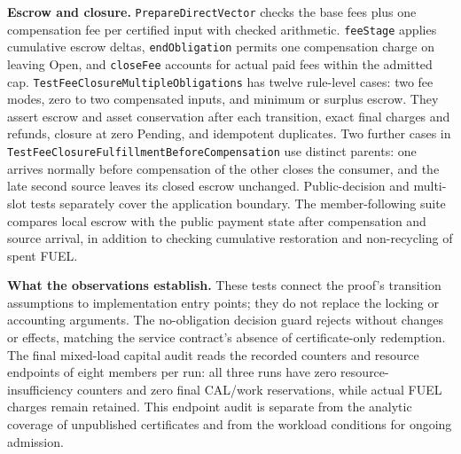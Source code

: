\noindent\textbf{Escrow and closure.}
\texttt{PrepareDirectVector} checks the base fees plus one compensation fee per
certified input with checked arithmetic. \texttt{feeStage} applies cumulative
escrow deltas, \texttt{endObligation} permits one compensation charge on leaving
Open, and \texttt{closeFee} accounts for actual paid fees within the admitted
cap. \texttt{Test\allowbreak Fee\allowbreak Closure\allowbreak Multiple\allowbreak Obligations} has twelve rule-level cases:
two fee modes, zero to two compensated inputs, and minimum or surplus escrow.
They assert escrow and asset conservation after each transition, exact final
charges and refunds, closure at zero Pending, and idempotent duplicates.
Two further cases in \texttt{Test\allowbreak Fee\allowbreak Closure\allowbreak Fulfillment\allowbreak Before\allowbreak Compensation}
use distinct parents: one arrives normally before compensation of the other
closes the consumer, and the late second source leaves its closed escrow
unchanged. Public-decision and multi-slot tests separately cover the
application boundary. The member-following suite compares local escrow with
the public payment state after compensation and source arrival, in addition
to checking cumulative restoration and non-recycling of spent FUEL.

\noindent\textbf{What the observations establish.}
These tests connect the proof's transition assumptions to implementation
entry points; they do not replace the locking or accounting arguments.
The no-obligation decision guard rejects without changes or effects, matching
the service contract's absence of certificate-only redemption. The final
mixed-load capital audit reads the recorded counters and resource endpoints
of eight members per run: all three runs have zero resource-insufficiency
counters and zero final CAL/work reservations, while actual FUEL charges
remain retained. This endpoint audit is separate from the analytic coverage
of unpublished certificates and from the workload conditions for ongoing
admission.
